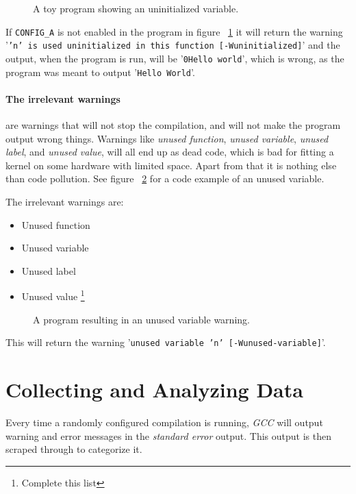 \documentclass[a4paper,11pt]{report}
\newcommand{\textcode}[1]{
    \fboxsep=1pt
    \texttt{\colorbox{gray!20}{#1}}
}
\newcommand{\figa}{
    \begin{figure}[!htpb]
    \centering
}
\newcommand{\figb}[2]{
    \caption{#1}
    \label{#2}
    \end{figure}
}
\begin{document}
\figa
    
\figb{A toy program showing an uninitialized variable.}{lst:uninitvar}

If \textcode{CONFIG\_A} is not enabled in the program in figure 
~\ref{lst:uninitvar} it will return the warning 
'\texttt{'n' is used uninitialized in this function [-Wuninitialized]}' and the 
output, when the program is run, will be '\texttt{0Hello world}',
which is wrong, as the program was meant to output '\texttt{Hello World}'.

    \paragraph{The irrelevant warnings}
are warnings that will not stop the compilation, and will not make the program 
output wrong things. Warnings like \emph{unused function}, \emph{unused 
variable}, \emph{unused label}, and \emph{unused value}, will all end up as 
dead code, which is bad for fitting a kernel on some hardware with limited 
space. Apart from that it is nothing else than code pollution. See figure 
~\ref{lst:unusedvar} for a code example  of an unused variable.

The irrelevant warnings are:

\begin{itemize}
    \item Unused function
    \item Unused variable
    \item Unused label
    \item Unused value
        \footnote{Complete this list}
\end{itemize}

\figa
    
\figb{A program resulting in an unused variable warning.}{lst:unusedvar}

This will return the warning '\texttt{unused variable 'n' [-Wunused-variable]}'.

\fi %

\section{Collecting and Analyzing Data}

Every time a randomly configured compilation is running, \emph{GCC} will 
output warning and error messages in the \emph{standard error} output. This 
output is then scraped through to categorize it.
\end{document}
